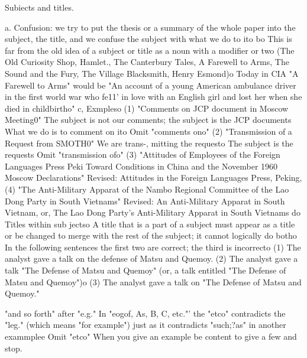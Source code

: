 \documentclass[
    oneside,
    11pt,
    draft
]{memoir}
\begin{document}
Subiects and titles. 

a. Confusion: we try to put the thesis or a summary of the whole paper into the subject, the title, and we confuse the subject with what we do to ito bo This is far from the old idea of a subject or title as a noun with a modifier or two (The Old Curiosity Shop, Hamlet., The Canterbury Tales, A Farewell to Arms, The Sound and the Fury, The Village Blacksmith, Henry Esmond)o Today in CIA "A Farewell to Arms" would be "An account of a young American ambulance driver in the first world war who fe11' in love with an English girl and lost her when she died in childbirtho" c, Exmpleso (1) "Comments on JCP document in Moscow Meeting0" The subject is not our comments; the subject is the JCP documents What we do is to comment on ito Omit "comments ono" (2) "Transmission of a Request from SMOTH0" We are trans-, mitting the requesto The subject is the requests Omit "transmission ofo" (3) "Attitudes of Employees of the Foreign Languages Press Peki Toward Conditions in China and the November 1960 Moscow Declarations" Revised: Attitudes in the Foreign Languages Press, Peking, (4) "The Anti-Military Apparat of the Nambo Regional Committee of the Lao Dong Party in South Vietnams" Revised: An Anti-Military Apparat in South Vietnam, or, The Lao Dong Party's Anti-Military Apparat in South Vietnams do Titles within sub jectso A title that is a part of a subject must appear as a title or be changed to merge with the rest of the subject; it cannot logically do botho In the following sentences the first two are correct; the third is incorrecto (1) The analyst gave a talk on the defense of Matsu and Quemoy. (2) The analyst gave a talk "The Defense of Matsu and Quemoy" (or, a talk entitled "The Defense of Matsu and Quemoy")o (3) The analyst gave a talk on "The Defense of Matsu and Quemoy." 

"and so forth" after "e.g." In "eogof, As, B, C, etc."' the "etco" contradicts the "leg." (which means "for example") just as it contradicts "such;?as" in another exammplee Omit "etco" When you give an example be content to give a few and stop.
\end{document}
